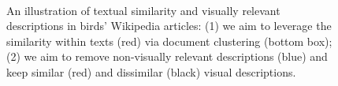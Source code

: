 \documentclass[11pt,a4paper]{article}
\newcommand\gal[1]{\textcolor{bright}{\textbf{GAL:} #1 }}
\newcommand\yuval[1]{\textcolor{darkpink}{\textbf{YUVAL:} #1 }}
\newcommand\tzuf[1]{\textcolor{blue}{\textbf{TZUF:} #1 }}
\begin{document}
\begin{figure}[H]
\centering
{}
 \caption{An illustration of textual similarity and visually relevant descriptions in birds' Wikipedia articles: (1) we aim to leverage the similarity within %
 texts (red) via document clustering (bottom box);
 (2) we aim to remove non-visually relevant descriptions (blue) and keep similar (red) and dissimilar (black) visual descriptions. %
 }\ %
\label{fig:bird_example}%
\end{figure}
\end{document}
